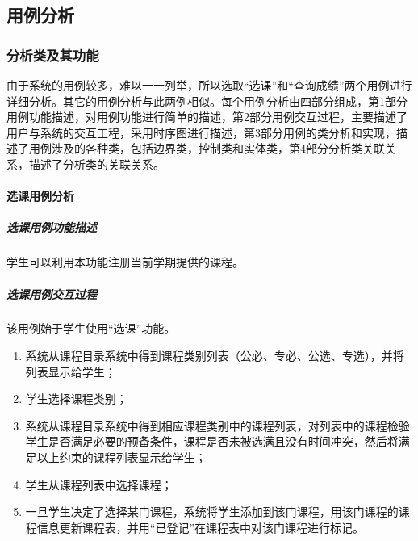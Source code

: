 \subsection{用例分析}
\subsubsection{分析类及其功能}
由于系统的用例较多，难以一一列举，所以选取“选课”和“查询成绩”两个用例进行详细分析。其它的用例分析与此两例相似。每个用例分析由四部分组成，第1部分用例功能描述，对用例功能进行简单的描述，第2部分用例交互过程，主要描述了用户与系统的交互工程，采用时序图进行描述，第3部分用例的类分析和实现，描述了用例涉及的各种类，包括边界类，控制类和实体类，第4部分分析类关联关系，描述了分析类的关联关系。

\paragraph{选课用例分析}
\subparagraph{选课用例功能描述}
学生可以利用本功能注册当前学期提供的课程。

\subparagraph{选课用例交互过程}
    
该用例始于学生使用“选课”功能。
    
\begin{enumerate}
  \item 系统从课程目录系统中得到课程类别列表（公必、专必、公选、专选），并将列表显示给学生；
  \item 学生选择课程类别；
  \item 系统从课程目录系统中得到相应课程类别中的课程列表，对列表中的课程检验学生是否满足必要的预备条件，课程是否未被选满且没有时间冲突，然后将满足以上约束的课程列表显示给学生；
  \item 学生从课程列表中选择课程；
  \item 一旦学生决定了选择某门课程，系统将学生添加到该门课程，用该门课程的课程信息更新课程表，并用“已登记”在课程表中对该门课程进行标记。
\end{enumerate}
    
